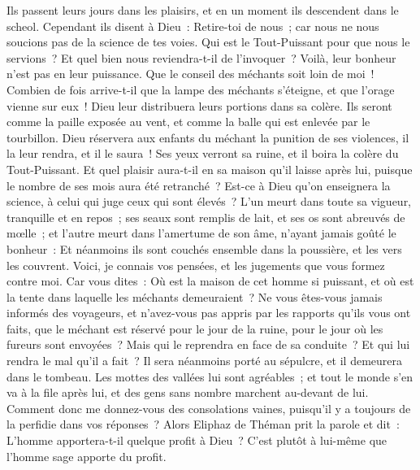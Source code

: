 \begin{multicols}{2}
Ils passent leurs jours dans les plaisirs, et en un moment ils descendent dans le scheol.
 Cependant ils disent à Dieu~: Retire-toi de nous~; car nous ne nous soucions pas de la science de tes voies.
Qui est le Tout-Puissant pour que nous le servions~? Et quel bien nous reviendra-t-il de l'invoquer~?
Voilà, leur bonheur n'est pas en leur puissance. Que le conseil des méchants soit loin de moi~!
Combien de fois arrive-t-il que la lampe des méchants s'éteigne, et que l'orage vienne sur eux~! Dieu leur distribuera leurs portions dans sa colère.
Ils seront comme la paille exposée au vent, et comme la balle qui est enlevée par le tourbillon.
Dieu réservera aux enfants du méchant la punition de ses violences, il la leur rendra, et il le saura~!
Ses yeux verront sa ruine, et il boira la colère du Tout-Puissant.
Et quel plaisir aura-t-il en sa maison qu'il laisse après lui, puisque le nombre de ses mois aura été retranché~?
Est-ce à Dieu qu'on enseignera la science, à celui qui juge ceux qui sont élevés~?
L'un meurt dans toute sa vigueur, tranquille et en repos~;
ses seaux sont remplis de lait, et ses os sont abreuvés de mœlle~;
et l'autre meurt dans l'amertume de son âme, n'ayant jamais goûté le bonheur~:
Et néanmoins ils sont couchés ensemble dans la poussière, et les vers les couvrent.
Voici, je connais vos pensées, et les jugements que vous formez contre moi.
Car vous dites~: Où est la maison de cet homme si puissant, et où est la tente dans laquelle les méchants demeuraient~?
Ne vous êtes-vous jamais informés des voyageurs, et n'avez-vous pas appris par les rapports qu'ils vous ont faits,
que le méchant est réservé pour le jour de la ruine, pour le jour où les fureurs sont envoyées~?
Mais qui le reprendra en face de sa conduite~? Et qui lui rendra le mal qu'il a fait~?
Il sera néanmoins porté au sépulcre, et il demeurera dans le tombeau.
Les mottes des vallées lui sont agréables~; et tout le monde s'en va à la file après lui, et des gens sans nombre marchent au-devant de lui.
Comment donc me donnez-vous des consolations vaines, puisqu'il y a toujours de la perfidie dans vos réponses~?
\VerseOne{}Alors Eliphaz de Théman prit la parole et dit~:
L'homme apportera-t-il quelque profit à Dieu~? C'est plutôt à lui-même que l'homme sage apporte du profit.

\end{multicols}
